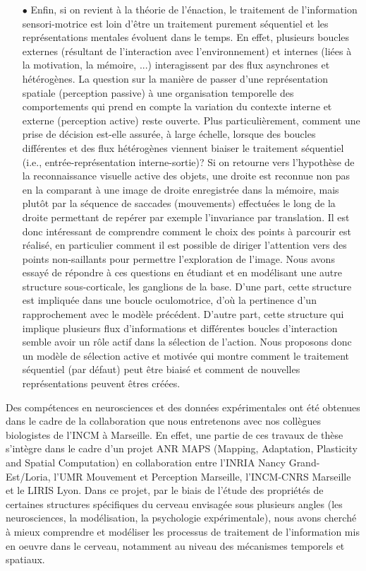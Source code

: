 \begin{itemize}
\item[$\bullet$]Enfin, si on revient à la théorie de l'énaction, le traitement de l'information sensori-motrice est loin d'être un traitement purement séquentiel et les représentations mentales évoluent dans le temps. En effet, plusieurs boucles externes (résultant de l'interaction avec l'environnement) et internes (liées à la motivation, la mémoire, ...) interagissent par des flux asynchrones et hétérogènes. La question sur la manière de passer d'une représentation spatiale (perception passive) à une organisation temporelle des comportements qui prend en compte la variation du contexte interne et externe (perception active) reste ouverte. Plus particulièrement, comment une prise de décision est-elle assurée, à large échelle, lorsque des boucles différentes et des flux hétérogènes viennent biaiser le traitement séquentiel (i.e., entrée-représentation interne-sortie)? Si on retourne vers l'hypothèse de la reconnaissance visuelle active des objets, une droite est reconnue non pas en la comparant à une image de droite enregistrée dans la mémoire, mais plutôt par la séquence de saccades (mouvements) effectuées le long de la droite permettant de repérer par exemple l'invariance par translation. Il est donc intéressant de comprendre comment le choix des points à parcourir est réalisé, en particulier comment il est possible de diriger l'attention vers des points non-saillants pour permettre l'exploration de l'image.
Nous avons essayé de répondre à ces questions en étudiant et en modélisant une autre structure sous-corticale, les ganglions de la base. D'une part, cette structure  est impliquée dans une boucle oculomotrice, d'o\`u la pertinence d'un rapprochement avec le modèle précédent. D'autre part, cette structure qui implique plusieurs flux d'informations et différentes boucles d'interaction semble avoir un rôle actif dans la sélection de l'action. Nous proposons donc un modèle de sélection active et motivée qui montre comment le traitement séquentiel (par défaut) peut être biaisé et comment de nouvelles représentations peuvent êtres créées.\\

\end{itemize}

Des compétences en neurosciences et des données expérimentales ont été obtenues dans le cadre de la collaboration que nous entretenons avec nos collègues biologistes de l'INCM à Marseille. En effet, une partie de ces travaux de thèse s'intègre dans le cadre d'un projet ANR MAPS (Mapping, Adaptation, Plasticity and Spatial Computation) en collaboration entre l'INRIA Nancy Grand-Est/Loria, l'UMR Mouvement et Perception Marseille, l'INCM-CNRS Marseille et le LIRIS Lyon. Dans ce projet, par le biais de l'étude des propriétés de certaines structures spécifiques du cerveau envisagée sous plusieurs angles (les neurosciences, la modélisation, la psychologie expérimentale), nous avons cherché à mieux comprendre et modéliser les processus de traitement de l'information mis en oeuvre dans le cerveau, notamment au niveau des mécanismes temporels et spatiaux.\\


